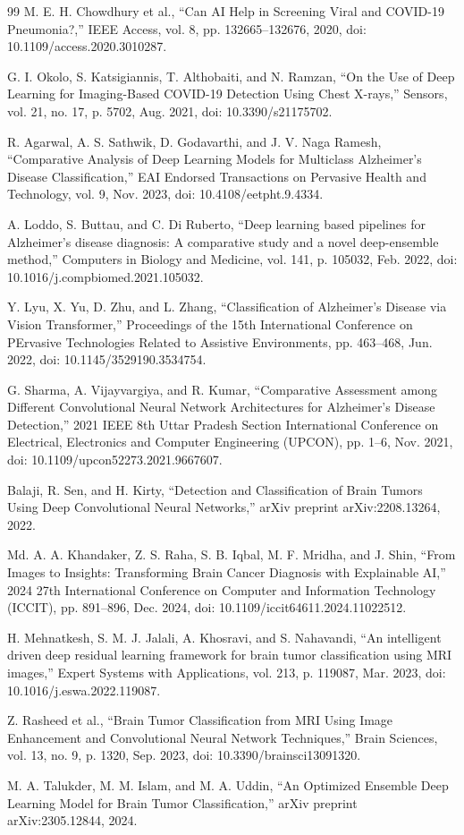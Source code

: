 \documentclass[letterpaper, 10 pt, conference]{ieeeconf}  %
\begin{document}
\begin{thebibliography}{99}
 M. E. H. Chowdhury et al., “Can AI Help in Screening Viral and COVID-19 Pneumonia?,” IEEE Access, vol. 8, pp. 132665–132676, 2020, doi: 10.1109/access.2020.3010287.

 G. I. Okolo, S. Katsigiannis, T. Althobaiti, and N. Ramzan, “On the Use of Deep Learning for Imaging-Based COVID-19 Detection Using Chest X-rays,” Sensors, vol. 21, no. 17, p. 5702, Aug. 2021, doi: 10.3390/s21175702.

 R. Agarwal, A. S. Sathwik, D. Godavarthi, and J. V. Naga Ramesh, “Comparative Analysis of Deep Learning Models for Multiclass Alzheimer’s Disease Classification,” EAI Endorsed Transactions on Pervasive Health and Technology, vol. 9, Nov. 2023, doi: 10.4108/eetpht.9.4334.

 A. Loddo, S. Buttau, and C. Di Ruberto, “Deep learning based pipelines for Alzheimer’s disease diagnosis: A comparative study and a novel deep-ensemble method,” Computers in Biology and Medicine, vol. 141, p. 105032, Feb. 2022, doi: 10.1016/j.compbiomed.2021.105032.

 Y. Lyu, X. Yu, D. Zhu, and L. Zhang, “Classification of Alzheimer’s Disease via Vision Transformer,” Proceedings of the 15th International Conference on PErvasive Technologies Related to Assistive Environments, pp. 463–468, Jun. 2022, doi: 10.1145/3529190.3534754.

 G. Sharma, A. Vijayvargiya, and R. Kumar, “Comparative Assessment among Different Convolutional Neural Network Architectures for Alzheimer’s Disease Detection,” 2021 IEEE 8th Uttar Pradesh Section International Conference on Electrical, Electronics and Computer Engineering (UPCON), pp. 1–6, Nov. 2021, doi: 10.1109/upcon52273.2021.9667607.

 Balaji, R. Sen, and H. Kirty, “Detection and Classification of Brain Tumors Using Deep Convolutional Neural Networks,” arXiv preprint arXiv:2208.13264, 2022.

 Md. A. A. Khandaker, Z. S. Raha, S. B. Iqbal, M. F. Mridha, and J. Shin, “From Images to Insights: Transforming Brain Cancer Diagnosis with Explainable AI,” 2024 27th International Conference on Computer and Information Technology (ICCIT), pp. 891–896, Dec. 2024, doi: 10.1109/iccit64611.2024.11022512.

 H. Mehnatkesh, S. M. J. Jalali, A. Khosravi, and S. Nahavandi, “An intelligent driven deep residual learning framework for brain tumor classification using MRI images,” Expert Systems with Applications, vol. 213, p. 119087, Mar. 2023, doi: 10.1016/j.eswa.2022.119087.

 Z. Rasheed et al., “Brain Tumor Classification from MRI Using Image Enhancement and Convolutional Neural Network Techniques,” Brain Sciences, vol. 13, no. 9, p. 1320, Sep. 2023, doi: 10.3390/brainsci13091320.

 M. A. Talukder, M. M. Islam, and M. A. Uddin, “An Optimized Ensemble Deep Learning Model for Brain Tumor Classification,” arXiv preprint arXiv:2305.12844, 2024.


\end{thebibliography}
\end{document}

